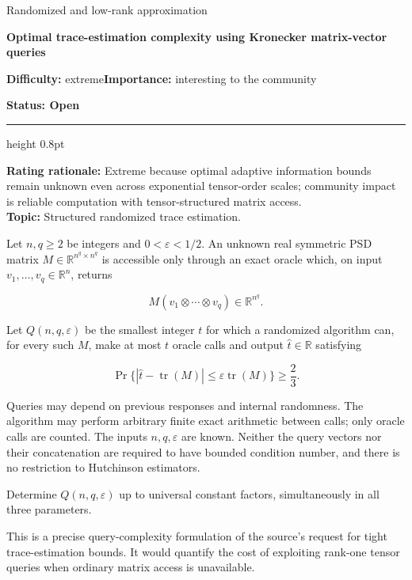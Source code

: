 \documentclass[11pt,a4paper]{article}
\begin{document}
{\sffamily\small\color{muted}Randomized and low-rank approximation\par}
\vspace{3pt}
{\raggedright{}\sffamily\bfseries\fontsize{21}{24}\selectfont\color{ink}Optimal
trace-estimation complexity using Kronecker matrix-vector queries\par}
\vspace{7pt}
{\sffamily\small\textbf{Difficulty:} extreme\quad\textbf{Importance:} interesting
to the community\par}
{\sffamily\small\bfseries\color{accent}Status: Open\par}
\vspace{4pt}
{\color{accent}\hrule height 0.8pt}
\vspace{6pt}
\textbf{Rating rationale:} Extreme because optimal adaptive information
bounds remain unknown even across exponential tensor-order scales;
community impact is reliable computation with tensor-structured matrix
access.\\
\textbf{Topic:} Structured randomized trace estimation.

Let \(n,q\ge2\) be integers and \(0<\varepsilon<1/2\). An unknown real
symmetric PSD matrix \(M\in\mathbb R^{n^q\times n^q}\) is accessible
only through an exact oracle which, on input
\(v_1,\ldots,v_q\in\mathbb R^n\), returns

\[
M(v_1\otimes\cdots\otimes v_q)\in\mathbb R^{n^q}.
\]

Let \(Q(n,q,\varepsilon)\) be the smallest integer \(t\) for which a
randomized algorithm can, for every such \(M\), make at most \(t\)
oracle calls and output \(\widehat t\in\mathbb R\) satisfying

\[
\Pr\bigl\{|\widehat t-\operatorname{tr}(M)|\le\varepsilon\operatorname{tr}(M)\bigr\}\ge\frac23.
\]

Queries may depend on previous responses and internal randomness. The
algorithm may perform arbitrary finite exact arithmetic between calls;
only oracle calls are counted. The inputs \(n,q,\varepsilon\) are known.
Neither the query vectors nor their concatenation are required to have
bounded condition number, and there is no restriction to Hutchinson
estimators.

Determine \(Q(n,q,\varepsilon)\) up to universal constant factors,
simultaneously in all three parameters.

This is a precise query-complexity formulation of the source's request
for tight trace-estimation bounds. It would quantify the cost of
exploiting rank-one tensor queries when ordinary matrix access is
unavailable.
\end{document}
